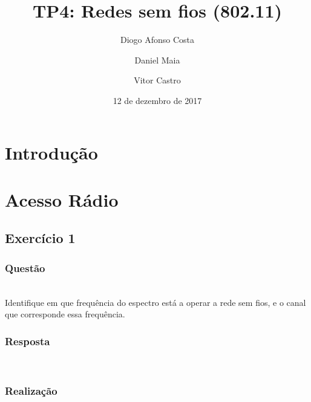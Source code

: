 \documentclass{llncs}
\begin{document}
\mainmatter
\title{TP4: Redes sem fios (802.11)}


\author{Diogo Afonso Costa \and Daniel Maia \and Vitor Castro}



\date{12 de dezembro de 2017}


\maketitle
\begin{abstract}

\end{abstract}

\section{Introdução}



\clearpage
\section{Acesso Rádio}

\subsection{Exercício 1}
\subsubsection{Questão}\rule[-10pt]{0pt}{10pt}\\

Identifique em que frequência do espectro está a operar a rede sem fios, e o canal que corresponde essa frequência.

\subsubsection{Resposta}\rule[-10pt]{0pt}{10pt}\\



\subsubsection{Realização}\rule[-10pt]{0pt}{10pt}\\
\end{document}
